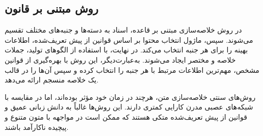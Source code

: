 \subsection{روش مبتنی بر قانون }


در روش خلاصه‌سازی مبتنی بر قاعده، اسناد به دسته‌ها و جنبه‌های مختلف تقسیم می‌شوند. سپس، ماژول انتخاب محتوا بر اساس قوانین از پیش تعریف‌شده، اطلاعات بهینه را برای هر جنبه انتخاب می‌کند. در نهایت، با استفاده از الگوهای تولید، جملات خلاصه و مختصر ایجاد می‌شوند. به‌عبارت‌دیگر، این روش با بهره‌گیری از قوانین مشخص، مهم‌ترین اطلاعات مرتبط با هر جنبه را انتخاب کرده و سپس آن‌ها را در قالب یک خلاصه منسجم ارائه می‌دهد\cite{Moratanchsurvey}.




% 
روش‌های سنتی خلاصه‌سازی متن، هرچند در زمان خود مؤثر بوده‌اند، اما در مقایسه با شبکه‌های عصبی مدرن کارایی کمتری دارند. این روش‌ها غالباً به دانش زبانی عمیق و قوانین از پیش تعریف‌شده متکی هستند که ممکن است در مواجهه با متون متنوع و پیچیده ناکارآمد باشند.









